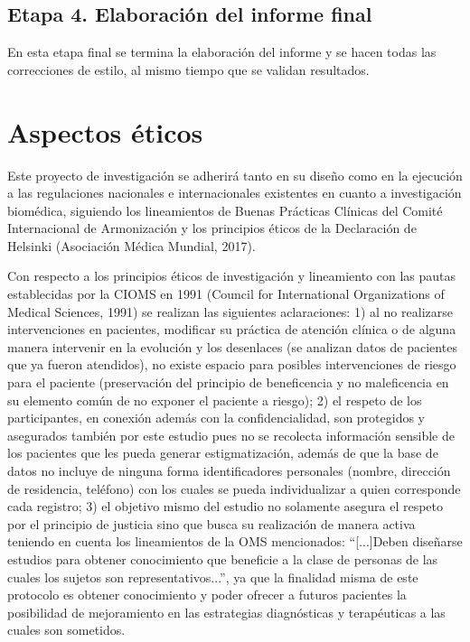 \documentclass[12pt,letterpaper,final, openany]{scrbook}
\begin{document}
\section{Etapa 4. Elaboración del informe final}
En esta etapa final se termina la elaboración del informe y se hacen todas las correcciones de estilo, al mismo tiempo que se validan resultados.

\newpage
\chapter{Aspectos éticos}
Este proyecto de investigación se adherirá tanto en su diseño como en la ejecución a las regulaciones nacionales e internacionales existentes en cuanto a investigación biomédica, siguiendo los lineamientos de Buenas Prácticas Clínicas del Comité Internacional de Armonización y los principios éticos de la Declaración de Helsinki (Asociación Médica Mundial, 2017)\cite{noauthor_wma_nodate}.

Con respecto a los principios éticos de investigación y lineamiento con las pautas establecidas por la CIOMS en 1991 (Council for International Organizations of Medical Sciences\cite{council_for_international_organizations_of_medical_sciences_cioms_international_2016}, 1991) se realizan las siguientes aclaraciones: 1) al no realizarse intervenciones en pacientes, modificar su práctica de atención clínica o de alguna manera intervenir en la evolución y los desenlaces (se analizan datos de pacientes que ya fueron atendidos), no existe espacio para posibles intervenciones de riesgo para el paciente (preservación del principio de beneficencia y no maleficencia en su elemento común de no exponer el paciente a riesgo); 2) el respeto de los participantes, en conexión además con la confidencialidad, son protegidos y asegurados también por este estudio pues no se recolecta información sensible de los pacientes que les pueda generar estigmatización, además de que la base de datos no incluye de ninguna forma identificadores personales (nombre, dirección de residencia, teléfono) con los cuales se pueda individualizar a quien corresponde cada registro; 3) el objetivo mismo del estudio no solamente asegura el respeto por el principio de justicia sino que busca su realización de manera activa teniendo en cuenta los lineamientos de la OMS mencionados: ``[...]Deben diseñarse estudios para obtener conocimiento que beneficie a la clase de personas de las cuales los sujetos son representativos...”, ya que la finalidad misma de este protocolo es obtener conocimiento y poder ofrecer a futuros pacientes la posibilidad de mejoramiento en las estrategias diagnósticas y terapéuticas a las cuales son sometidos.
\end{document}

